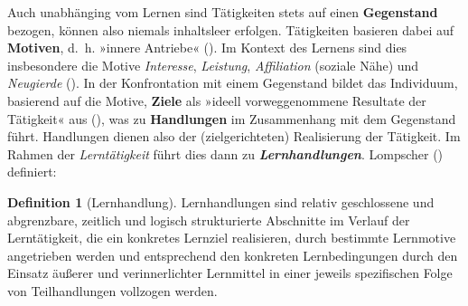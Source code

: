 \documentclass[
]{scrbook}
\theoremstyle{definition}
\newtheorem{definition}{Definition}[chapter]
\theoremstyle{definition}
\theoremstyle{definition}
\theoremstyle{definition}
\theoremstyle{remark}
\begin{document}
Auch unabhänging vom Lernen sind Tätigkeiten stets auf einen \textbf{Gegenstand} bezogen, können also niemals inhaltsleer erfolgen. Tätigkeiten basieren dabei auf \textbf{Motiven}, d.~h. »innere Antriebe« (). Im Kontext des Lernens sind dies insbesondere die Motive \emph{Interesse}, \emph{Leistung}, \emph{Affiliation} (soziale Nähe) und \emph{Neugierde} (). In der Konfrontation mit einem Gegenstand bildet das Individuum, basierend auf die Motive, \textbf{Ziele} als »ideell vorweggenommene Resultate der Tätigkeit« aus (), was zu \textbf{Handlungen} im Zusammenhang mit dem Gegenstand führt. Handlungen dienen also der (zielgerichteten) Realisierung der Tätigkeit.
Im Rahmen der \emph{Lerntätigkeit} führt dies dann zu \textbf{\emph{Lernhandlungen}}. Lompscher () definiert:

\begin{definition}[Lernhandlung]
\protect\hypertarget{def:Lernhandlung}{}\label{def:Lernhandlung}Lernhandlungen sind relativ geschlossene und abgrenzbare, zeitlich und logisch strukturierte Abschnitte im Verlauf der Lerntätigkeit, die ein konkretes Lernziel realisieren, durch bestimmte Lernmotive angetrieben werden und entsprechend den konkreten Lernbedingungen durch den Einsatz äußerer und verinnerlichter Lernmittel in einer jeweils spezifischen Folge von Teilhandlungen vollzogen werden.
\end{definition}
\end{document}
